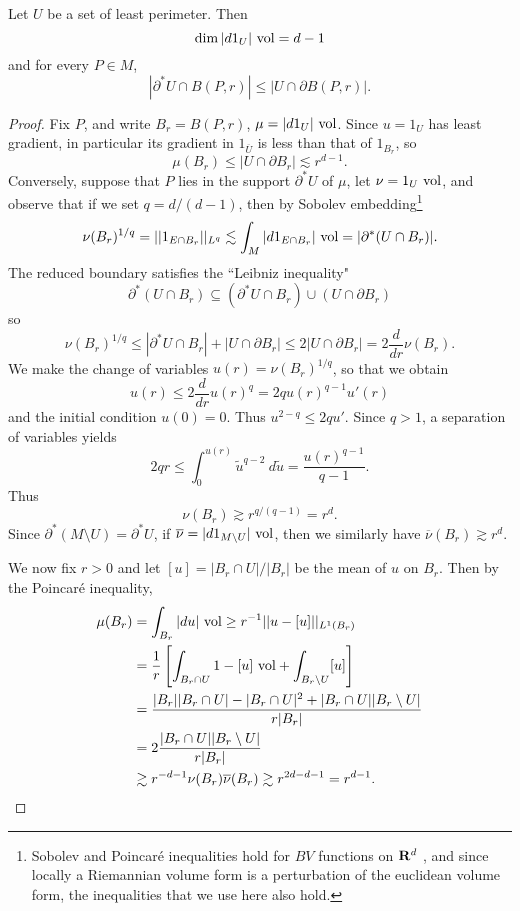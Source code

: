 \begin{proposition}\label{doubling dimension}
Let $U$ be a set of least perimeter. Then
$$\dim |d1_U|~\mathrm{vol} = d - 1$$
and for every $P \in M$,
$$|\partial^* U \cap B(P, r)| \leq |U \cap \partial B(P, r)|.$$
\end{proposition}
\begin{proof}
Fix $P$, and write $B_r = B(P, r)$, $\mu =|d1_U| ~\mathrm{vol}$.
Since $u = 1_U$ has least gradient, in particular its gradient in $1_{\overline U}$ is less than that of $1_{B_r}$, so
$$\mu(B_r) \leq |U \cap \partial B_r| \lesssim r^{d - 1}.$$
Conversely, suppose that $P$ lies in the support $\partial^* U$ of $\mu$, let $\nu = 1_U ~\mathrm{vol}$, and observe that if we set $q = d/(d - 1)$, then by Sobolev embedding\footnote{Sobolev and Poincar\'e inequalities hold for $BV$ functions on $\mathbf{R}^d$ \cite[\S5.6.1]{evans1991measure},
and since locally a Riemannian volume form is a perturbation of the euclidean volume form, the inequalities that we use here also hold.}
$$\nu(B_r)^{1/q} = ||1_{E \cap B_r}||_{L^q} \lesssim \int_M |d1_{E \cap B_r}| ~\mathrm{vol} = |\partial^*(U \cap B_r)|.$$
The reduced boundary satisfies the ``Leibniz inequality"
$$\partial^*(U \cap B_r) \subseteq (\partial^* U \cap B_r) \cup (U \cap \partial B_r)$$
so
$$\nu(B_r)^{1/q} \leq |\partial^* U \cap B_r| + |U \cap \partial B_r| \leq 2|U \cap \partial B_r| = 2\frac{d}{dr} \nu(B_r).$$
We make the change of variables $u(r) = \nu(B_r)^{1/q}$, so that we obtain
$$u(r) \leq 2 \frac{d}{dr} u(r)^q = 2qu(r)^{q - 1}u'(r)$$
and the initial condition $u(0) = 0$. Thus $u^{2 - q} \leq 2qu'$.
Since $q > 1$, a separation of variables yields
$$2qr \leq \int_0^{u(r)} \tilde u^{q - 2}~d\tilde u = \frac{u(r)^{q - 1}}{q - 1}.$$
Thus
$$\nu(B_r) \gtrsim r^{q/(q - 1)} = r^d.$$
Since $\partial^* (M \setminus U) = \partial^* U$, if $\overline{\nu} = |d1_{M \setminus U}| ~\mathrm{vol}$, then we similarly have $\overline{\nu}(B_r) \gtrsim r^d$.

We now fix $r > 0$ and let $[u] = |B_r \cap U|/|B_r|$ be the mean of $u$ on $B_r$. Then by the Poincar\'e inequality,
\begin{align*}
\mu(B_r) &= \int_{B_r} |du|~\mathrm{vol} \geq r^{-1} ||u - [u]||_{L^1(B_r)} \\
&= \frac{1}{r} \left[\int_{B_r \cap U} 1 -[u] ~\mathrm{vol} + \int_{B_r \setminus U} [u] \right] \\
&= \frac{|B_r||B_r \cap U| - |B_r \cap U|^2 + |B_r \cap U||B_r \setminus U|}{r|B_r|} \\
&= 2\frac{|B_r \cap U||B_r \setminus U|}{r|B_r|}\\
&\gtrsim r^{-d-1} \nu(B_r) \overline{\nu}(B_r) \gtrsim r^{2d-d-1} = r^{d - 1}. \qedhere
\end{align*}
\end{proof}

